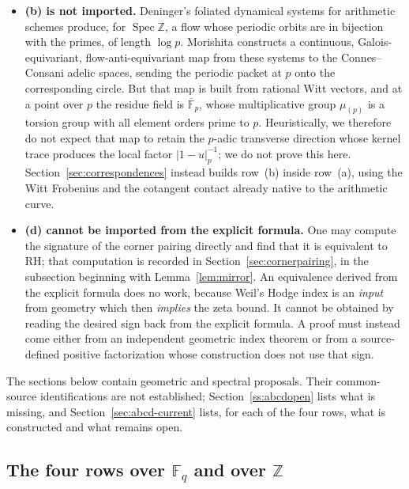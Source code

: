 \documentclass[11pt]{amsart}
\theoremstyle{definition}
\theoremstyle{remark}
\newcommand{\Z}{\mathbb Z}
\newcommand{\RH}{\mathrm{RH}}
\newcommand{\Spec}{\operatorname{Spec}}
\begin{document}
\begin{itemize}
\item \textbf{(b) is not imported.}  Deninger's foliated
dynamical systems for arithmetic schemes \cite{Deninger2024} produce, for
$\Spec\Z$, a flow whose periodic orbits are in bijection with the primes,
of length $\log p$.  Morishita \cite{Morishita2026} constructs a continuous,
Galois-equivariant, flow-anti-equivariant map from these systems to the
Connes--Consani adelic spaces, sending the periodic packet at $p$ onto the
corresponding circle.  But that map is built from rational Witt vectors, and
at a point over $p$ the residue field is $\overline{\mathbb F}_p$, whose
multiplicative group $\mu_{(p)}$ is a torsion group with all element orders prime to $p$.  Heuristically,
we therefore do not expect that map to retain the $p$-adic transverse
direction whose kernel trace produces the local factor $|1-u|_p^{-1}$; we
do not prove this here.  Section~\ref{sec:correspondences} instead builds row~(b)
inside row~(a), using the Witt Frobenius and the cotangent contact already
native to the arithmetic curve.

\item \textbf{(d) cannot be imported from the explicit formula.}  One may
compute the signature of the corner pairing directly and find that it is
equivalent to $\RH$; that computation is recorded in Section~\ref{sec:cornerpairing}, in
the subsection beginning with Lemma~\ref{lem:mirror}.  An equivalence
derived from the explicit formula does no work, because Weil's Hodge index
is an \emph{input} from geometry which then \emph{implies} the zeta bound.
It cannot be obtained by reading the desired sign back from the explicit
formula.  A proof must instead come either from an independent geometric
index theorem or from a source-defined positive factorization whose
construction does not use that sign.
\end{itemize}

The sections below contain geometric and spectral proposals.  Their
common-source identifications are not established; Section~\ref{ss:abcdopen}
lists what is missing, and Section~\ref{sec:abcd-current} lists, for each of
the four rows, what is constructed and what remains open.

\subsection{The four rows over $\mathbb F_q$ and over $\Z$}
\label{ss:map}
\end{document}
